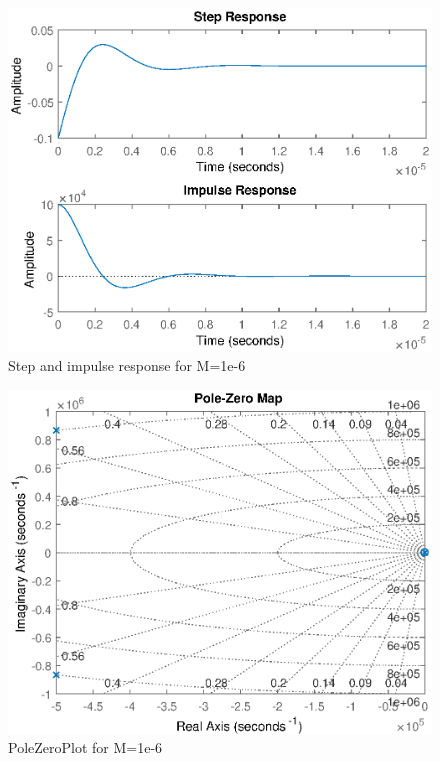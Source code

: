 \begin{figure}
    \centering
    \includegraphics[width=\textwidth]{img/CoilRigResponse.eps}
    \caption{Step and impulse response for M=1e-6}
    \label{fig:my_label}
\end{figure}

\begin{figure}
    \centering
    \includegraphics[width=\textwidth]{img/PoleZeroPlot.eps}
    \caption{PoleZeroPlot for M=1e-6}
    \label{fig:my_label}
\end{figure}


